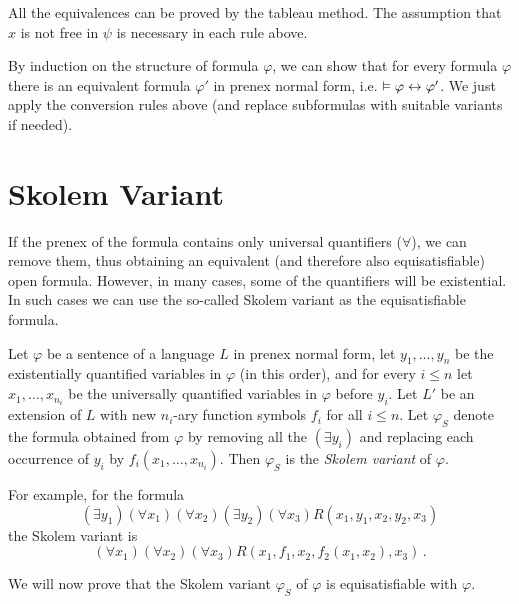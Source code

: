 All the equivalences can be proved by the tableau method. The assumption that $x$ is not free in $\psi$ is necessary in each rule above. 

By induction on the structure of formula $\varphi$, we can show that for every formula $\varphi$ there is an equivalent formula $\varphi'$ in prenex normal form, i.e. $\vDash \varphi \leftrightarrow \varphi'$. We just apply the conversion rules above (and replace subformulas with suitable variants if needed). 

\section{Skolem Variant}

If the prenex of the formula contains only universal quantifiers ($\forall$), we can remove them, thus obtaining an equivalent (and therefore also equisatisfiable) open formula. However, in many cases, some of the quantifiers will be existential. In such cases we can use the so-called Skolem variant as the equisatisfiable formula.

Let $\varphi$ be a sentence of a language $L$ in prenex normal form, let $y_1, \dots, y_n$ be the existentially quantified variables in $\varphi$ (in this order), and for every $i \leq n$ let $x_1, \dots, x_{n_i}$ be the universally quantified variables in $\varphi$ before $y_i$. Let $L'$ be an extension of $L$ with new $n_i$-ary function symbols $f_i$ for all $i \leq n$. Let $\varphi_S$ denote the formula obtained from $\varphi$ by removing all the $(\exists y_i)$ and replacing each occurrence of $y_i$ by $f_i(x_1, \dots, x_{n_i})$. Then $\varphi_S$ is the \emph{Skolem variant} of $\varphi$.

For example, for the formula $$(\exists y_1)(\forall x_1)(\forall x_2)(\exists y_2)(\forall x_3)R(x_1, y_1, x_2, y_2, x_3)$$ the Skolem variant is $$(\forall x_1)(\forall x_2)(\forall x_3)R(x_1, f_1, x_2, f_2(x_1, x_2), x_3)\,.$$ 


We will now prove that the Skolem variant $\varphi_S$ of $\varphi$ is equisatisfiable with $\varphi$. 

